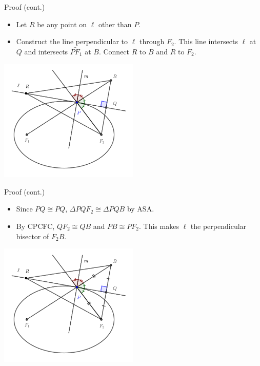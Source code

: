 \documentclass[compress,aspectratio=169,10pt,usenames,dvipsnames]{beamer}
\begin{document}
\begin{frame}

\vfill

\begin{block}{Proof (cont.)}
\begin{itemize}
\item Let $R$ be any point on $\ell$ other than $P$. 
\item Construct the line perpendicular to $\ell$ through $F_2$. This line intersects $\ell$ at $Q$ and intersects $\overleftrightarrow{PF_1}$ at $B$. Connect $R$ to $B$ and $R$ to $F_2$. 
\end{itemize}
\end{block}

\begin{center}
\includegraphics[width=0.5\textwidth]{EllipseProp1B}
\end{center}

\vfill

\end{frame}


\begin{frame}

\vfill

\begin{block}{Proof (cont.)}
\begin{itemize}
\item Since $PQ \cong PQ$, $\Delta PQF_2 \cong \Delta PQB$ by ASA.  
\item By CPCFC, $QF_2 \cong QB$ and $PB \cong PF_2$. This makes $\ell$ the perpendicular bisector of $F_2B$. 
\end{itemize}
\end{block}

\begin{center}
\includegraphics[width=0.5\textwidth]{EllipseProp1C}
\end{center}

\vfill

\end{frame}
\end{document}
